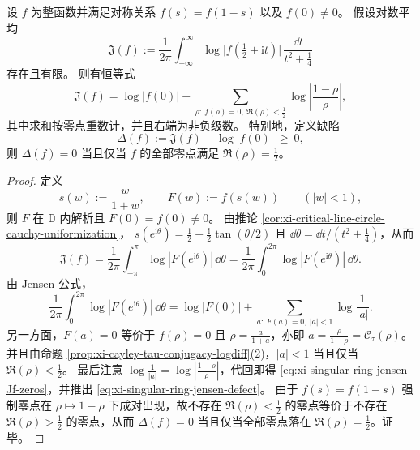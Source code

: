 \begin{theorem}\label{thm:xi-singular-ring-jensen-identity-defect}
设 \(f\) 为整函数并满足对称关系 \(f(s)=f(1-s)\) 以及 \(f(0)\neq 0\)。
假设对数平均
\begin{equation}\label{eq:xi-singular-ring-jensen-Jf-def}
\mathfrak J(f):=\frac{1}{2\pi}\int_{-\infty}^{\infty}\log\bigl|f(\tfrac12+\mathrm{i}t)\bigr|\,
\frac{\dd t}{t^2+\tfrac14}
\end{equation}
存在且有限。
则有恒等式
\begin{equation}\label{eq:xi-singular-ring-jensen-Jf-zeros}
\mathfrak J(f)=\log|f(0)|+\sum_{\rho:\ f(\rho)=0,\ \Re(\rho)<\tfrac12}\log\left|\frac{1-\rho}{\rho}\right|,
\end{equation}
其中求和按零点重数计，并且右端为非负级数。
特别地，定义缺陷
\begin{equation}\label{eq:xi-singular-ring-jensen-defect}
\Delta(f):=\mathfrak J(f)-\log|f(0)|\ \ge\ 0,
\end{equation}
则 \(\Delta(f)=0\) 当且仅当 \(f\) 的全部零点满足 \(\Re(\rho)=\tfrac12\)。
\end{theorem}
\begin{proof}
定义
\[
s(w):=\frac{w}{1+w},\qquad F(w):=f(s(w))\qquad(|w|<1),
\]
则 \(F\) 在 \(\mathbb D\) 内解析且 \(F(0)=f(0)\neq 0\)。
由推论 \ref{cor:xi-critical-line-circle-cauchy-uniformization}，
\(
s(e^{\mathrm{i}\theta})=\tfrac12+\frac{\mathrm{i}}{2}\tan(\theta/2)
\)
且 \(\dd\theta=\dd t/(t^2+\tfrac14)\)，从而
\[
\mathfrak J(f)=\frac{1}{2\pi}\int_{-\pi}^{\pi}\log|F(e^{\mathrm{i}\theta})|\,\dd\theta
=\frac{1}{2\pi}\int_{0}^{2\pi}\log|F(e^{\mathrm{i}\theta})|\,\dd\theta.
\]
由 Jensen 公式，
\[
\frac{1}{2\pi}\int_{0}^{2\pi}\log|F(e^{\mathrm{i}\theta})|\,\dd\theta
=\log|F(0)|+\sum_{a:\ F(a)=0,\ |a|<1}\log\frac{1}{|a|}.
\]
另一方面，\(F(a)=0\) 等价于 \(f(\rho)=0\) 且 \(\rho=\frac{a}{1+a}\)，亦即 \(a=\frac{\rho}{1-\rho}=\mathcal C_\tau(\rho)\)。
并且由命题 \ref{prop:xi-cayley-tau-conjugacy-logdiff}(2)，\(|a|<1\) 当且仅当 \(\Re(\rho)<\tfrac12\)。
最后注意
\(
\log\frac1{|a|}=\log\left|\frac{1-\rho}{\rho}\right|
\)，代回即得 \eqref{eq:xi-singular-ring-jensen-Jf-zeros}，并推出 \eqref{eq:xi-singular-ring-jensen-defect}。
由于 \(f(s)=f(1-s)\) 强制零点在 \(\rho\mapsto 1-\rho\) 下成对出现，故不存在 \(\Re(\rho)<\tfrac12\) 的零点等价于不存在 \(\Re(\rho)>\tfrac12\) 的零点，从而 \(\Delta(f)=0\) 当且仅当全部零点落在 \(\Re(\rho)=\tfrac12\)。证毕。
\end{proof}

